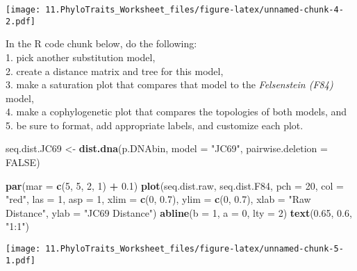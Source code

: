 \documentclass[]{article}
\newenvironment{Shaded}{\begin{snugshade}}{\end{snugshade}}
\newcommand{\KeywordTok}[1]{\textcolor[rgb]{0.13,0.29,0.53}{\textbf{#1}}}
\newcommand{\DataTypeTok}[1]{\textcolor[rgb]{0.13,0.29,0.53}{#1}}
\newcommand{\DecValTok}[1]{\textcolor[rgb]{0.00,0.00,0.81}{#1}}
\newcommand{\FloatTok}[1]{\textcolor[rgb]{0.00,0.00,0.81}{#1}}
\newcommand{\StringTok}[1]{\textcolor[rgb]{0.31,0.60,0.02}{#1}}
\newcommand{\OtherTok}[1]{\textcolor[rgb]{0.56,0.35,0.01}{#1}}
\newcommand{\OperatorTok}[1]{\textcolor[rgb]{0.81,0.36,0.00}{\textbf{#1}}}
\newcommand{\NormalTok}[1]{#1}
\begin{document}
\texttt{[image: 11.PhyloTraits\_Worksheet\_files/figure-latex/unnamed-chunk-4-2.pdf]}

In the R code chunk below, do the following:\\
1. pick another substitution model,\\
2. create a distance matrix and tree for this model,\\
3. make a saturation plot that compares that model to the
\emph{Felsenstein (F84)} model,\\
4. make a cophylogenetic plot that compares the topologies of both
models, and\\
5. be sure to format, add appropriate labels, and customize each plot.

\begin{Shaded}
\begin{Highlighting}[]
\NormalTok{seq.dist.JC69 <-}\StringTok{ }\KeywordTok{dist.dna}\NormalTok{(p.DNAbin, }\DataTypeTok{model =} \StringTok{"JC69"}\NormalTok{, }\DataTypeTok{pairwise.deletion =} \OtherTok{FALSE}\NormalTok{)}

\KeywordTok{par}\NormalTok{(}\DataTypeTok{mar =} \KeywordTok{c}\NormalTok{(}\DecValTok{5}\NormalTok{, }\DecValTok{5}\NormalTok{, }\DecValTok{2}\NormalTok{, }\DecValTok{1}\NormalTok{) }\OperatorTok{+}\StringTok{ }\FloatTok{0.1}\NormalTok{)}
\KeywordTok{plot}\NormalTok{(seq.dist.raw, seq.dist.F84,}
     \DataTypeTok{pch =} \DecValTok{20}\NormalTok{, }\DataTypeTok{col =} \StringTok{"red"}\NormalTok{, }\DataTypeTok{las =} \DecValTok{1}\NormalTok{, }\DataTypeTok{asp =} \DecValTok{1}\NormalTok{, }\DataTypeTok{xlim =} \KeywordTok{c}\NormalTok{(}\DecValTok{0}\NormalTok{, }\FloatTok{0.7}\NormalTok{), }\DataTypeTok{ylim =} \KeywordTok{c}\NormalTok{(}\DecValTok{0}\NormalTok{, }\FloatTok{0.7}\NormalTok{), }
     \DataTypeTok{xlab =} \StringTok{"Raw Distance"}\NormalTok{, }\DataTypeTok{ylab =} \StringTok{"JC69 Distance"}\NormalTok{) }
\KeywordTok{abline}\NormalTok{(}\DataTypeTok{b =} \DecValTok{1}\NormalTok{, }\DataTypeTok{a =} \DecValTok{0}\NormalTok{, }\DataTypeTok{lty =} \DecValTok{2}\NormalTok{)}
\KeywordTok{text}\NormalTok{(}\FloatTok{0.65}\NormalTok{, }\FloatTok{0.6}\NormalTok{, }\StringTok{"1:1"}\NormalTok{)}
\end{Highlighting}
\end{Shaded}

\texttt{[image: 11.PhyloTraits\_Worksheet\_files/figure-latex/unnamed-chunk-5-1.pdf]}
\end{document}
